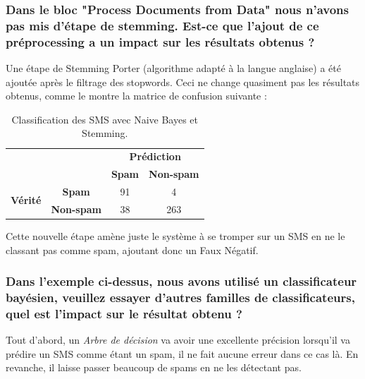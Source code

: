 \documentclass[a4paper]{article}
\begin{document}
\subsubsection*{Dans le bloc "Process Documents from Data" nous n'avons pas mis d'étape de stemming. Est-ce que l'ajout de ce préprocessing a un impact sur les résultats obtenus ?}
Une étape de Stemming Porter (algorithme adapté à la langue anglaise) a été ajoutée après le filtrage des stopwords.
Ceci ne change quasiment pas les résultats obtenus, comme le montre la matrice de confusion suivante :
\begin{table}[H]
	\centering
	\def\arraystretch{2.0}
	\begin{tabular}{cccl}
	& \textbf{}
	& \multicolumn{2}{c}{\textbf{Prédiction}}\\ \cline{3-4} 
	& \multicolumn{1}{c|}{}
	& \multicolumn{1}{c|}{\textbf{Spam}}
	& \multicolumn{1}{c|}{\textbf{Non-spam}} \\ \cline{2-4} 
	\multicolumn{1}{c|}{\multirow{2}{*}{\textbf{Vérité}}}
	& \multicolumn{1}{c|}{\textbf{Spam}}
	& \multicolumn{1}{c|}{91}
	& \multicolumn{1}{c|}{4}\\ \cline{2-4} 
	\multicolumn{1}{c|}{}
	& \multicolumn{1}{c|}{\textbf{Non-spam}}
	& \multicolumn{1}{c|}{38}
	& \multicolumn{1}{c|}{263}               \\ \cline{2-4} 
	\end{tabular}
	\caption{Classification des SMS avec Naive Bayes et Stemming.}
\end{table}

Cette nouvelle étape amène juste le système à se tromper sur un SMS en ne le classant pas comme spam, ajoutant donc un Faux Négatif.

\subsubsection*{Dans l'exemple ci-dessus, nous avons utilisé un classificateur bayésien, veuillez essayer d'autres familles de classificateurs, quel est l'impact sur le résultat obtenu ?}

Tout d'abord, un \textit{Arbre de décision} va avoir une excellente précision lorsqu'il va prédire un SMS comme étant un spam, il ne fait aucune erreur dans ce cas là.
En revanche, il laisse passer beaucoup de spams en ne les détectant pas.
\end{document}
